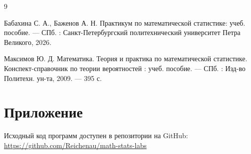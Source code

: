 \documentclass[a4paper, 14pt]{extarticle}
\begin{document}
\renewcommand{\refname}{\thesection\ Список литературы}

\begin{thebibliography}{9}

    Бабахина С. А., Баженов А. Н. Практикум по математической статистике: учеб. пособие. — СПб. : Санкт-Петербургский политехнический университет Петра Великого, 2026. 

    Максимов Ю. Д. Математика. Теория и практика по математической статистике. Конспект-справочник по теории вероятностей : учеб. пособие. — СПб. : Изд-во Политехн. ун-та, 2009. — 395 с. 

\end{thebibliography}

\section{Приложение}

Исходный код программ доступен в репозитории на GitHub: \\
\url{https://github.com/Reichenau/math-stats-labs}
 
\end{document}
